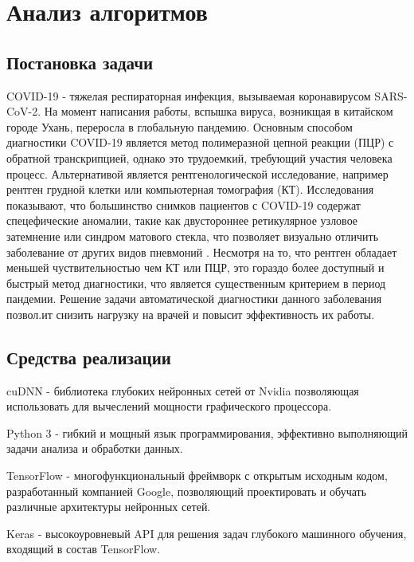 \section{Анализ алгоритмов} \label{Dev}

\subsection{Постановка задачи}
COVID-19 - тяжелая респираторная инфекция, вызываемая коронавирусом SARS-CoV-2. На момент написания работы, вспышка вируса, возникщая в китайском городе Ухань, переросла в глобальную пандемию. Основным способом диагностики COVID-19 является метод полимеразной цепной реакции (ПЦР) с обратной транскрипцией, однако это трудоемкий, требующий участия человека процесс. Альтернативой является рентгенологической исследование, например рентген грудной клетки или компьютерная томография (КТ). Исследования показывают, что большинство снимков пациентов с COVID-19 содержат спецефические аномалии, такие как двустороннее ретикулярное узловое затемнение или синдром матового стекла, что позволяет визуально отличить заболевание от других видов пневмоний \cite{wang2020covidnet}. Несмотря на то, что рентген обладает меньшей чуствительностью чем КТ или ПЦР, это гораздо более доступный и быстрый метод диагностики, что является существенным критерием в период пандемии. Решение задачи автоматической диагностики данного заболевания позвол.ит снизить нагрузку на врачей и повысит эффективность их работы.


\subsection{Средства реализации}
cuDNN - библиотека глубоких нейронных сетей от Nvidia позволяющая использовать для вычеслений мощности графического процессора.

Python 3 - гибкий и мощный язык программирования, эффективно выполняющий задачи анализа и обработки данных.

TensorFlow - многофункциональный фреймворк с открытым исходным кодом, разработанный компанией Google, позволяющий проектировать и обучать различные архитектуры нейронных сетей.

Keras - высокоуровневый API для решения задач глубокого машинного обучения, входящий в состав TensorFlow.

